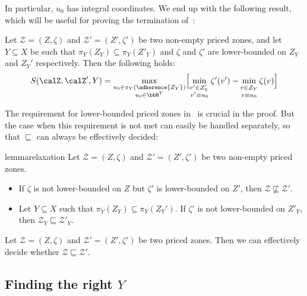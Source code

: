 In particular, $u_0$ has integral coordinates. We end up with the
following result, which will be useful for proving the termination
of~:
\begin{corollary}
  \label{theo:vertices}\label{coro:vertices}
  Let $\mathcal{Z}=(Z,\zeta)$ and $\mathcal{Z}'=(Z',\zeta')$ be two
  non-empty priced zones, and let $Y \subseteq X$ be such that
  $\pi_Y(Z_Y) \subseteq \pi_Y(Z'_Y)$ and $\zeta$ and $\zeta'$ are
  lower-bounded on $Z_Y$ and $Z_Y'$ respectively. Then the following
  holds:
  \[
S(\calZ,\calZ',Y) = \max_{\substack{u_0 \in \pi_Y(\adherence{Z_Y})
      \\u_0\in\bbN^Y}} \Bigl[
  \min_{\substack{\vphantom{\adherence{Z_Y}}v' \in Z'_Y \\
      v'\equiv u_0}} \zeta'(v') -
  \min_{\substack{\vphantom{\adherence{Z_Y}Z'_Y}v \in Z_Y\\ \vphantom{v'}v\equiv u_0}}
  \zeta(v)\Bigr]
  \]
\end{corollary}

The requirement for lower-bounded priced zones
in~ is crucial in the proof. 
But the case when this requirement is not met can easily be handled separately, so
that $\sqsubseteq$ can always be effectively decided:

\begin{restatable}{lemma}{relaxation}
  \label{lemma:relaxation}
  Let $\mathcal{Z}=(Z,\zeta)$ and $\mathcal{Z}'=(Z',\zeta')$ be two
  non-empty priced zones.
  \begin{itemize}
  \item If $\zeta$ is not lower-bounded on $Z$ but $\zeta'$ is
    lower-bounded on $Z'$, then $\mathcal{Z} \not\sqsubseteq
    \mathcal{Z}'$.
  \item Let $Y \subseteq X$ such that $\pi_Y(Z_Y) \subseteq \pi_Y(Z_Y')$. If $\zeta'$ is not lower-bounded on
    $Z'_Y$, then $\mathcal{Z}_Y \sqsubseteq \mathcal{Z}'_Y$.
  \end{itemize}
\end{restatable}

\begin{corollary}
  Let $\mathcal{Z}=(Z,\zeta)$ and $\mathcal{Z}'=(Z',\zeta')$ be two
  priced zones. Then we can effectively decide whether $\mathcal{Z}
  \sqsubseteq \mathcal{Z}'$.
\end{corollary}

\subsection{Finding the right $Y$}
\label{sec:righty}

